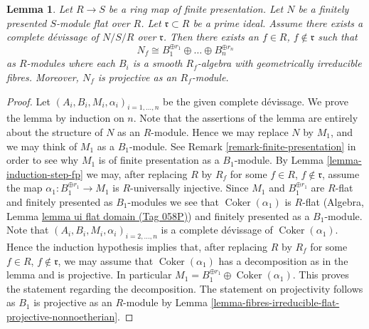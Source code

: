 \documentclass{amsart}
\theoremstyle{plain}
\newtheorem{lemma}[subsection]{Lemma}
\theoremstyle{definition}
\theoremstyle{remark}
\numberwithin{equation}{subsection}
\def\Coker{\mathop{\mathrm{Coker}}}
\begin{document}
\begin{lemma}
\label{lemma-complete-devissage-flat-finitely-presented-module}
Let $R \to S$ be a ring map of finite presentation.
Let $N$ be a finitely presented $S$-module flat over $R$.
Let $\mathfrak r \subset R$ be a prime ideal.
Assume there exists a complete d\'evissage of $N/S/R$ over $\mathfrak r$.
Then there exists an $f \in R$, $f \not \in \mathfrak r$
such that
$$
N_f \cong B_1^{\oplus r_1} \oplus \ldots \oplus B_n^{\oplus r_n}
$$
as $R$-modules where each $B_i$ is a smooth $R_f$-algebra with geometrically
irreducible fibres. Moreover, $N_f$ is projective as an $R_f$-module.
\end{lemma}

\begin{proof}
Let $(A_i, B_i, M_i, \alpha_i)_{i = 1, \ldots, n}$ be the given
complete d\'evissage. We prove the lemma by induction on $n$.
Note that the assertions of the lemma are entirely about the structure
of $N$ as an $R$-module. Hence we may replace $N$ by $M_1$, and we
may think of $M_1$ as a $B_1$-module. See
Remark \ref{remark-finite-presentation}
in order to see why $M_1$ is of finite presentation as a $B_1$-module. By
Lemma \ref{lemma-induction-step-fp}
we may, after replacing $R$ by $R_f$ for some
$f \in R$, $f \not \in \mathfrak r$, assume
the map $\alpha_1 : B_1^{\oplus r_1} \to M_1$ is $R$-universally injective.
Since $M_1$ and $B_1^{\oplus r_1}$ are $R$-flat and finitely presented as
$B_1$-modules we see that $\Coker(\alpha_1)$ is $R$-flat
(Algebra, Lemma \href{https://stacks.math.columbia.edu/tag/058P}{lemma ui flat domain (Tag 058P)})
and finitely presented as a $B_1$-module. Note that
$(A_i, B_i, M_i, \alpha_i)_{i = 2, \ldots, n}$ is a complete
d\'evissage of $\Coker(\alpha_1)$. Hence the induction hypothesis
implies that, after replacing
$R$ by $R_f$ for some $f \in R$, $f \not \in \mathfrak r$,
we may assume that $\Coker(\alpha_1)$ has a decomposition
as in the lemma and is projective. In particular
$M_1 = B_1^{\oplus r_1} \oplus \Coker(\alpha_1)$.
This proves the statement regarding the decomposition.
The statement on projectivity follows as $B_1$ is projective as
an $R$-module by
Lemma \ref{lemma-fibres-irreducible-flat-projective-nonnoetherian}.
\end{proof}
\end{document}
